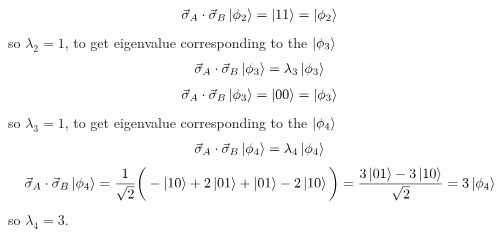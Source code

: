 \documentclass{article}
\begin{document}
\begin{align*}
    \vec{\sigma}_A \cdot \vec{\sigma}_B \ket{\phi_{2}} = \ket{11} = \ket{\phi_{2}} 
\end{align*}
so $\lambda_2=1$, to get eigenvalue corresponding to the $\ket{\phi_3}$
\begin{align*}
    \vec{\sigma}_A \cdot \vec{\sigma}_B \ket{\phi_{3}} = \lambda_{3} \ket{\phi_{3}}
\end{align*}
\begin{align*}
    \vec{\sigma}_A \cdot \vec{\sigma}_B \ket{\phi_{3}} = \ket{00} = \ket{\phi_{3}} 
\end{align*}
so $\lambda_3=1$,  to get eigenvalue corresponding to the $\ket{\phi_4}$
\begin{align*}
    \vec{\sigma}_A \cdot \vec{\sigma}_B \ket{\phi_{4}} = \lambda_{4} \ket{\phi_{4}}
\end{align*}
\begin{align*}
    \vec{\sigma}_A \cdot \vec{\sigma}_B \ket{\phi_{4}} = \frac{1}{\sqrt{2}}\bigg(-\ket{10}+2\ket{01}+\ket{01}-2\ket{10}\bigg) = \frac{3\ket{01}-3\ket{10}}{\sqrt{2}} = 3\ket{\phi_{4}} 
\end{align*}
so $\lambda_4=3$.
\end{document}
